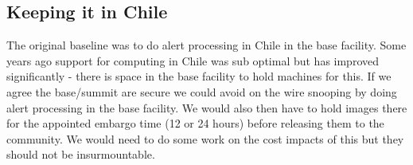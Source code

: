 \subsection{Keeping it in Chile}\label{sec:chile}
The original baseline was to do alert processing in Chile in the base facility. Some years ago support for computing in Chile was sub optimal but has improved significantly - there is space in the base facility to hold machines for this.  If we agree the base/summit are secure we could avoid on the wire snooping by doing alert processing in the base facility. We would also then have to hold images there for the appointed embargo time (12 or 24 hours) before releasing them to the community. We would need to do some work on the cost impacts of this but they should not be insurmountable.
